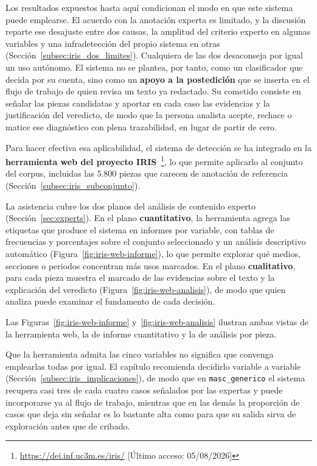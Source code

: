
Los resultados expuestos hasta aquí condicionan el modo en que este sistema puede
emplearse. El acuerdo con la anotación experta es limitado, y la discusión reparte ese
desajuste entre dos causas, la amplitud del criterio experto en algunas variables y una
infradetección del propio sistema en otras (Sección~\ref{subsec:iris_dos_limites}).
Cualquiera de las dos desaconseja por igual un uso autónomo. El sistema no se plantea,
por tanto, como un clasificador que decida por su cuenta, sino como un \textbf{apoyo a
la postedición} que se inserta en el flujo de trabajo de quien revisa un texto ya
redactado. Su cometido consiste en señalar las piezas candidatas y aportar en cada
caso las evidencias y la justificación del veredicto, de modo que la persona analista
acepte, rechace o matice ese diagnóstico con plena trazabilidad, en lugar de
partir de cero.

Para hacer efectiva esa aplicabilidad, el sistema de detección se ha integrado en
la \textbf{herramienta web del proyecto IRIS}~\cite{avi2026}\footnote{\url{https://dei.inf.uc3m.es/iris/} [Último acceso: 05/08/2026]},
lo que permite aplicarlo al conjunto del corpus, incluidas las 5.800 piezas que
carecen de anotación de referencia (Sección~\ref{subsec:iris_subconjunto}).

La asistencia cubre los dos planos del análisis de contenido experto
(Sección~\ref{sec:experts}). En el plano \textbf{cuantitativo}, la herramienta agrega
las etiquetas que produce el sistema en informes por variable, con tablas de
frecuencias y porcentajes sobre el conjunto seleccionado y un análisis descriptivo
automático (Figura~\ref{fig:iris-web-informe}), lo que permite explorar qué medios,
secciones o periodos concentran más usos marcados. En el plano \textbf{cualitativo},
para cada pieza muestra el marcado de las evidencias sobre el texto y la explicación
del veredicto (Figura~\ref{fig:iris-web-analisis}), de modo que quien analiza puede
examinar el fundamento de cada decisión.

Las Figuras~\ref{fig:iris-web-informe} y~\ref{fig:iris-web-analisis} ilustran ambas
vistas de la herramienta web, la de informe cuantitativo y la de análisis por pieza.

Que la herramienta admita las cinco variables no significa que convenga emplearlas
todas por igual. El capítulo recomienda decidirlo variable a variable
(Sección~\ref{subsec:iris_implicaciones}), de modo que en \texttt{masc\_generico} el
sistema recupera casi tres de cada cuatro casos señalados por las expertas y puede
incorporarse ya al flujo de trabajo, mientras que en las demás la proporción de casos
que deja sin señalar es lo bastante alta como para que su salida sirva de exploración
antes que de cribado.

